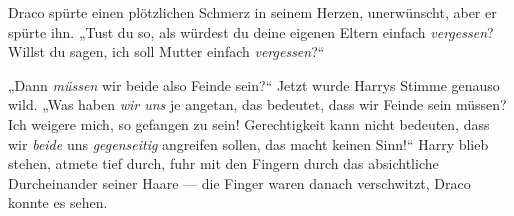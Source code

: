 Draco spürte einen plötzlichen Schmerz in seinem Herzen, unerwünscht, aber er spürte ihn.
„Tust du so, als würdest du deine eigenen Eltern einfach \emph{vergessen}? Willst du sagen, ich soll Mutter einfach \emph{vergessen}?“

„Dann \emph{müssen} wir beide also Feinde sein?“ Jetzt wurde Harrys Stimme genauso wild.
„Was haben \emph{wir uns} je angetan, das bedeutet, dass wir Feinde sein müssen? Ich weigere mich, so gefangen zu sein! Gerechtigkeit kann nicht bedeuten, dass wir \emph{beide} uns \emph{gegenseitig} angreifen sollen, das macht keinen Sinn!“ Harry blieb stehen, atmete tief durch, fuhr mit den Fingern durch das absichtliche Durcheinander seiner Haare — die Finger waren danach verschwitzt, Draco konnte es sehen.
